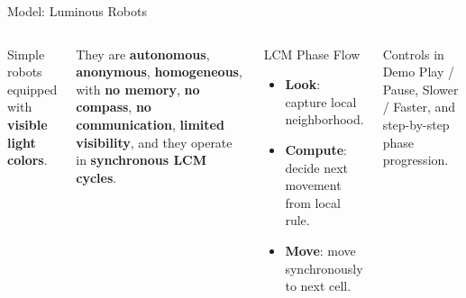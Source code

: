 \begin{frame}{Model: Luminous Robots}
\begin{columns}[T,totalwidth=\textwidth]
Simple robots equipped with \textbf{visible light colors}.

\vspace{0.2cm}
They are \textbf{autonomous}, \textbf{anonymous}, \textbf{homogeneous}, with
\textbf{no memory}, \textbf{no compass}, \textbf{no communication},
\textbf{limited visibility}, and they operate in \textbf{synchronous LCM cycles}.

\vspace{0.4cm}

\begin{block}{LCM Phase Flow}
\begin{itemize}
  \item \textbf{Look}: capture local neighborhood.
  \item \textbf{Compute}: decide next movement from local rule.
  \item \textbf{Move}: move synchronously to next cell.
\end{itemize}
\end{block}

\begin{block}{Controls in Demo}
Play / Pause, Slower / Faster, and step-by-step phase progression.
\end{block}
\end{columns}
\end{frame}
